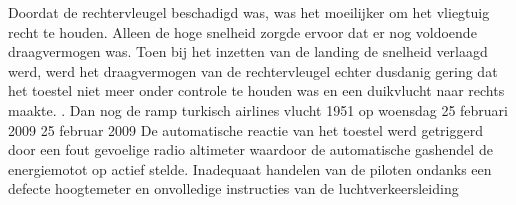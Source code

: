 Doordat de rechtervleugel beschadigd was, was het moeilijker om het vliegtuig recht te houden. Alleen de hoge snelheid zorgde ervoor dat er nog voldoende draagvermogen was. Toen bij het inzetten van de landing de snelheid verlaagd werd, werd het draagvermogen van de rechtervleugel echter dusdanig gering dat het toestel niet meer onder controle te houden was en een duikvlucht naar rechts maakte.
\cite{aviationsafety04101992airplaneCrashBijlmer}
 \cite{catsr25022009Boeing737AmsterdamCrash}
\cite{zuilen23022019Tijdlijnpoldercrash}
\cite{wikinews04032009techfoutailines1951}
\cite{luchtvaartnieuws21012020boeing737conclusies}
\cite{adformatie280220209communicatiegebreken}
\cite{spinnael25022009onderzoekpolderbaancrash}
\cite{crashTurkishAirlines}
\cite{flightradar24}
\cite{flightstatstracker}. 
\newline \indent Dan nog de  ramp turkisch airlines vlucht 1951 op woensdag 25 februari 2009
25 februar 2009
De automatische reactie van het toestel werd getriggerd door een fout gevoelige radio altimeter waardoor de automatische gashendel de energiemotot op actief stelde.
Inadequaat handelen van de piloten ondanks een defecte hoogtemeter en onvolledige instructies van de luchtverkeersleiding
\cite{catsr25022009Boeing737AmsterdamCrash}
\cite{zuilen23022019Tijdlijnpoldercrash}
\cite{wikinews04032009techfoutailines1951}
\cite{luchtvaartnieuws21012020boeing737conclusies}
